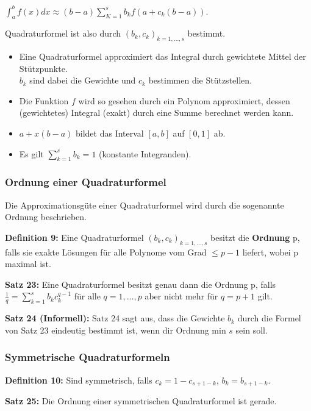 \documentclass[a4paper]{article}
\begin{document}
$\int_a^b f(x) dx \approx (b - a) \sum\limits_{K = 1}^s b_k f(a + c_k(b - a))$.

Quadraturformel ist also durch $(b_k, c_k)_{k = 1, \dots, s}$ bestimmt.

\begin{itemize}
    \item Eine Quadraturformel approximiert das Integral durch gewichtete Mittel
    der Stützpunkte.\\ $b_k$ sind dabei die Gewichte und $c_k$ bestimmen die
    Stützstellen.
    \item Die Funktion $f$ wird so gesehen durch ein Polynom approximiert,
    dessen (gewichtetes) Integral (exakt) durch eine Summe berechnet werden
    kann.
    \item $a +  x (b - a)$ bildet das Interval $[a, b]$ auf $[0, 1]$ ab.
    \item Es gilt $\sum\limits_{k = 1}^s b_k = 1$ (konstante Integranden).
\end{itemize}


\subsubsection{Ordnung einer Quadraturformel}

Die Approximationsgüte einer Quadraturformel wird durch die sogenannte Ordnung
beschrieben.

\textbf{Definition 9:} Eine Quadraturformel $(b_k, c_k)_{k = 1, \dots,s}$
besitzt die \textbf{Ordnung} p, falls sie exakte Lösungen für alle Polynome vom
Grad $\le p - 1$ liefert, wobei p maximal ist.

\textbf{Satz 23:} Eine Quadraturformel besitzt genau dann die Ordnung p, falls
$\frac{1}{q} = \sum\limits_{k = 1}^s b_k c_k^{q - 1}$ für alle $q = 1, \dots, p$
aber nicht mehr für $q = p + 1$ gilt.

\textbf{Satz 24 (Informell):} Satz 24 sagt aus, dass die Gewichte $b_k$ durch
die Formel von Satz 23 eindeutig bestimmt ist, wenn dir Ordnung min $s$ sein
soll.

\subsubsection{Symmetrische Quadraturformeln}

\textbf{Definition 10:} Sind symmetrisch, falls $c_k = 1 - c_{s + 1 -k}$, 
\hspace{1em}
$b_k = b_{s + 1 - k}$.

\textbf{Satz 25:} Die Ordnung einer symmetrischen Quadraturformel ist gerade.
\end{document}
